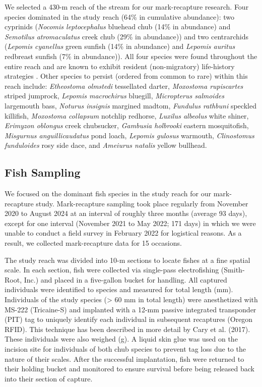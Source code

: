 \documentclass[11pt, class=article, crop=false]{standalone}
\begin{document}
We selected a 430-m reach of the stream for our mark-recapture research. Four species dominated in the study reach (64\% in cumulative abundance): two cyprinids (\textit{Nocomis leptocephalus} bluehead chub  (14\% in abundance) and \textit{Semotilus atromaculatus} creek chub (29\% in abundance)) and two centrarchids (\textit{Lepomis cyanellus} green sunfish (14\% in abundance) and \textit{Lepomis auritus} redbreast sunfish (7\% in abundance)). All four species were found throughout the entire reach and are known to exhibit resident (non-migratory) life-history strategies \citep{teruiNonrandomDispersalSympatric2021}. Other species to persist (ordered from common to rare) within this reach include: \textit{Etheostoma olmstedi} tessellated darter, \textit{Moxostoma rupiscartes} striped jumprock, \textit{Lepomis macrochirus} bluegill, \textit{Micropterus salmoides} largemouth bass, \textit{Noturus insignis} margined madtom, \textit{Fundulus rathbuni} speckled killifish, \textit{Moxostoma collapsum} notchlip redhorse, \textit{Luxilus albeolus} white shiner, \textit{Erimyzon oblongus} creek chubsucker, \textit{Gambusia holbrooki} eastern mosquitofish, \textit{Misgurnus anguillicaudatus} pond loach, \textit{Lepomis gulosus} warmouth, \textit{Clinostomus funduloides} rosy side dace, and \textit{Ameiurus natalis} yellow bullhead. 

\subsection{Fish Sampling}

We focused on the dominant fish species in the study reach for our mark-recapture study. Mark-recapture sampling took place regularly from November 2020 to August 2024 at an interval of roughly three months (average 93 days), except for one interval (November 2021 to May 2022; 171 days) in which we were unable to conduct a field survey in February 2022 for logistical reasons. As a result, we collected mark-recapture data for 15 occasions.

The study reach was divided into 10-m sections to locate fishes at a fine spatial scale. In each section, fish were collected via single-pass electrofishing (Smith-Root, Inc.) and placed in a five-gallon bucket for handling. All captured individuals were identified to species and measured for total length (mm). Individuals of the study species (> 60 mm in total length) were anesthetized with MS-222 (Tricaine-S) and implanted with a 12-mm passive integrated transponder (PIT) tag to uniquely identify each individual in subsequent recaptures (Oregon RFID). This technique has been described in more detail by Cary et al. (2017). These individuals were also weighed (g). A liquid skin glue was used on the incision site for individuals of both chub species to prevent tag loss due to the nature of their scales. After the successful implantation, fish were returned to their holding bucket and monitored to ensure survival before being released back into their section of capture. 
\end{document}
